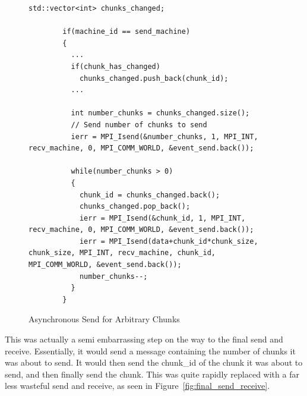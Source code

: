 \documentclass[../thesis.tex]{subfiles}
\begin{document}
    \begin{figure}[htbp]
      \centering

      \lstset{language=cpp}  
      \begin{lstlisting}[tabsize=2]
        std::vector<int> chunks_changed;

        if(machine_id == send_machine)
        {
          ...
          if(chunk_has_changed)
            chunks_changed.push_back(chunk_id);
          ...

          int number_chunks = chunks_changed.size();
          // Send number of chunks to send
          ierr = MPI_Isend(&number_chunks, 1, MPI_INT, recv_machine, 0, MPI_COMM_WORLD, &event_send.back());

          while(number_chunks > 0)
          {
            chunk_id = chunks_changed.back();
            chunks_changed.pop_back();
            ierr = MPI_Isend(&chunk_id, 1, MPI_INT, recv_machine, 0, MPI_COMM_WORLD, &event_send.back());
            ierr = MPI_Isend(data+chunk_id*chunk_size, chunk_size, MPI_INT, recv_machine, chunk_id, MPI_COMM_WORLD, &event_send.back());
            number_chunks--;
          }
        }
        \end{lstlisting}

      \caption{Asynchronous Send for Arbitrary Chunks}
      \label{fig:async_send_of_arbitrary_chunks}
    \end{figure}

    This was actually a semi embarrassing step on the way to the final send and receive. Essentially, it would send a message containing the number of chunks it was about to send. It would then send the chunk\_id of the chunk it was about to send, and then finally send the chunk. This was quite rapidly replaced with a far less wasteful send and receive, as seen in Figure~\ref{fig:final_send_receive}.
\end{document}
